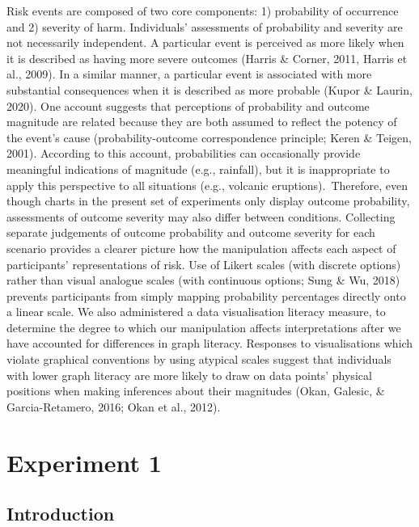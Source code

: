 \documentclass[journal]{vgtc}                %
\begin{document}
Risk events are composed of two core components: 1) probability of occurrence and 2) severity of harm. Individuals' assessments of probability and severity are not necessarily independent. A particular event is perceived as more likely when it is described as having more severe outcomes (Harris \& Corner, 2011, Harris et al., 2009). In a similar manner, a particular event is associated with more substantial consequences when it is described as more probable (Kupor \& Laurin, 2020). One account suggests that perceptions of probability and outcome magnitude are related because they are both assumed to reflect the potency of the event's cause (probability-outcome correspondence principle; Keren \& Teigen, 2001). According to this account, probabilities can occasionally provide meaningful indications of magnitude (e.g., rainfall), but it is inappropriate to apply this perspective to all situations (e.g., volcanic eruptions).~Therefore, even though charts in the present set of experiments only display outcome probability, assessments of outcome severity may also differ between conditions. Collecting separate judgements of outcome probability and outcome severity for each scenario provides a clearer picture how the manipulation affects each aspect of participants' representations of risk. Use of Likert scales (with discrete options) rather than visual analogue scales (with continuous options; Sung \& Wu, 2018) prevents participants from simply mapping probability percentages directly onto a linear scale. We also administered a data visualisation literacy measure, to determine the degree to which our manipulation affects interpretations after we have accounted for differences in graph literacy. Responses to visualisations which violate graphical conventions by using atypical scales suggest that individuals with lower graph literacy are more likely to draw on data points' physical positions when making inferences about their magnitudes (Okan, Galesic, \& Garcia-Retamero, 2016; Okan et al., 2012).

\hypertarget{experiment-1}{%
\section{Experiment 1}\label{experiment-1}}

\hypertarget{introduction-1}{%
\subsection{Introduction}\label{introduction-1}}
\end{document}
